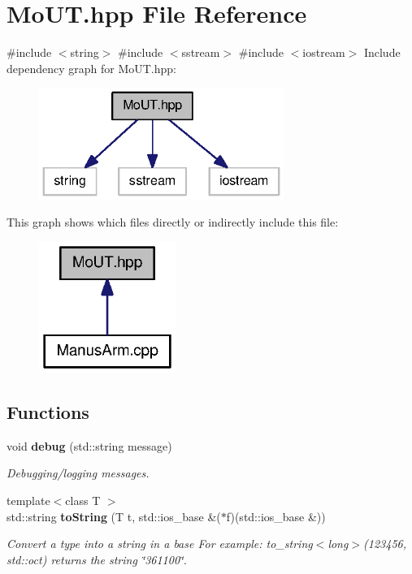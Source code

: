 \section{\-Mo\-U\-T.\-hpp \-File \-Reference}
\label{MoUT_8hpp}
{\ttfamily \#include $<$string$>$}\*
{\ttfamily \#include $<$sstream$>$}\*
{\ttfamily \#include $<$iostream$>$}\*
\-Include dependency graph for \-Mo\-U\-T.\-hpp\-:\nopagebreak
\begin{figure}[H]
\begin{center}
\leavevmode
\includegraphics[width=226pt]{MoUT_8hpp__incl}
\end{center}
\end{figure}
\-This graph shows which files directly or indirectly include this file\-:\nopagebreak
\begin{figure}[H]
\begin{center}
\leavevmode
\includegraphics[width=126pt]{MoUT_8hpp__dep__incl}
\end{center}
\end{figure}
\subsection*{\-Functions}
\begin{DoxyCompactItemize}
\item 
void {\bf debug} (std\-::string message)
\begin{DoxyCompactList}\small\item\em \-Debugging/logging messages. \end{DoxyCompactList}\item 
{\footnotesize template$<$class T $>$ }\\std\-::string {\bf to\-String} (\-T t, std\-::ios\-\_\-base \&($\ast$f)(std\-::ios\-\_\-base \&))
\begin{DoxyCompactList}\small\item\em \-Convert a type into a string in a base \-For example\-: to\-\_\-string$<$long$>$(123456, std\-::oct) returns the string \char`\"{}361100\char`\"{}. \end{DoxyCompactList}\end{DoxyCompactItemize}


